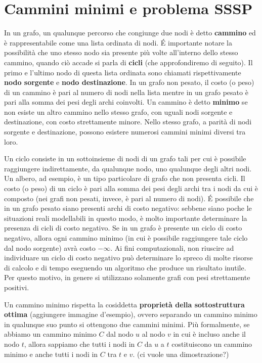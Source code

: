 \documentclass[12pt,a4paper]{book} %
\begin{document}
	\section{Cammini minimi e problema SSSP}
	\label{section:sssp}
	In un grafo, un qualunque percorso che congiunge due nodi è detto \textbf{cammino} ed è rappresentabile come una lista ordinata di nodi. \'E importante notare la possibilità che uno stesso nodo sia presente più volte all'interno dello stesso cammino, quando ciò accade si parla di \textbf{cicli} (che approfondiremo di seguito). Il primo e l'ultimo nodo di questa lista ordinata sono chiamati rispettivamente \textbf{nodo sorgente} e \textbf{nodo destinazione}. In un grafo non pesato, il costo (o peso) di un cammino è pari al numero di nodi nella lista mentre in un grafo pesato è pari alla somma dei pesi degli archi coinvolti. Un cammino è detto \textbf{minimo} se non esiste un altro cammino nello stesso grafo, con uguali nodi sorgente e destinazione, con costo strettamente minore. Nello stesso grafo, a parità di nodi sorgente e destinazione, possono esistere numerosi cammini minimi diversi tra loro.
	
	Un ciclo consiste in un sottoinsieme di nodi di un grafo tali per cui è possibile raggiungere indirettamente, da qualunque nodo, uno qualunque degli altri nodi. Un albero, ad esempio, è un tipo particolare di grafo che non presenta cicli. Il costo (o peso) di un ciclo è pari alla somma dei pesi degli archi tra i nodi da cui è composto (nei grafi non pesati, invece, è pari al numero di nodi). \'E possibile che in un grafo pesato siano presenti archi di costo negativo: sebbene siano poche le situazioni reali modellabili in questo modo, è molto importante determinare la presenza di cicli di costo negativo. Se in un grafo è presente un ciclo di costo negativo, allora ogni cammino minimo (in cui è possibile raggiungere tale ciclo dal nodo sorgente) avrà costo $-\infty$. Ai fini computazionali, non riuscire ad individuare un ciclo di costo negativo può determinare lo spreco di molte risorse di calcolo e di tempo eseguendo un algoritmo che produce un risultato inutile. Per questo motivo, in genere si utilizzano solamente grafi con pesi strettamente positivi.
	
	Un cammino minimo rispetta la cosiddetta \textbf{proprietà della sottostruttura ottima} (aggiungere immagine d'esempio), ovvero separando un cammino minimo in qualunque suo punto si ottengono due cammini minimi. Più formalmente, se abbiamo un cammino minimo $C$ dal nodo $u$ al nodo $v$ in cui è incluso anche il nodo $t$, allora sappiamo che tutti i nodi in $C$ da $u$ a $t$ costituiscono un cammino minimo e anche tutti i nodi in $C$ tra $t$ e $v$. (ci vuole una dimostrazione?)
	
\end{document}
